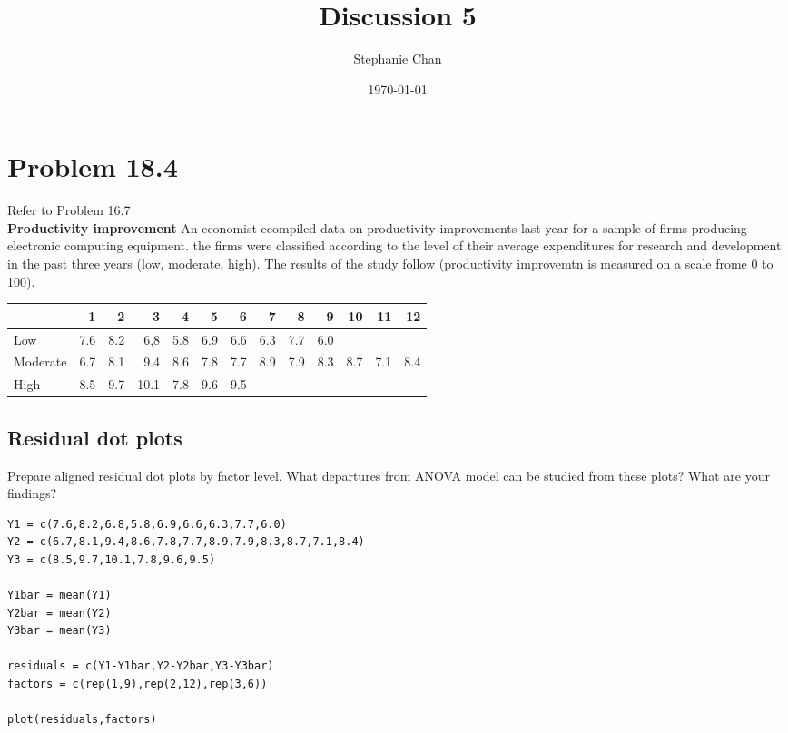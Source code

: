 \documentclass[11pt]{article}
\title{Discussion 5}
\author{Stephanie Chan}
\date{\today}
\begin{document}


\section{Problem 18.4}
\label{sec-1}

  Refer to Problem 16.7\\
\textbf{Productivity improvement} An economist ecompiled data on productivity
improvements last year for a sample of firms producing electronic
computing equipment.  the firms were classified according to the
level of their average expenditures for research and development in
the past three years (low, moderate, high).  The results of the study
follow (productivity improvemtn is measured on a scale frome 0 to
100).

\begin{center}
\begin{tabular}{lrrrrrrrrrrrr}
\hline
           &    1  &    2  &     3  &    4  &    5  &    6  &    7  &    8  &    9  &   10  &   11  &   12  \\
\hline
 Low       &  7.6  &  8.2  &   6,8  &  5.8  &  6.9  &  6.6  &  6.3  &  7.7  &  6.0  &       &       &       \\
 Moderate  &  6.7  &  8.1  &   9.4  &  8.6  &  7.8  &  7.7  &  8.9  &  7.9  &  8.3  &  8.7  &  7.1  &  8.4  \\
 High      &  8.5  &  9.7  &  10.1  &  7.8  &  9.6  &  9.5  &       &       &       &       &       &       \\
\hline
\end{tabular}
\end{center}
\subsection{Residual dot plots}
\label{sec-1-1}

Prepare aligned residual dot plots by factor level.  What departures
from ANOVA model can be studied from these plots?  What are your
findings?


\begin{verbatim}
Y1 = c(7.6,8.2,6.8,5.8,6.9,6.6,6.3,7.7,6.0)
Y2 = c(6.7,8.1,9.4,8.6,7.8,7.7,8.9,7.9,8.3,8.7,7.1,8.4)
Y3 = c(8.5,9.7,10.1,7.8,9.6,9.5)

Y1bar = mean(Y1)
Y2bar = mean(Y2)
Y3bar = mean(Y3)

residuals = c(Y1-Y1bar,Y2-Y2bar,Y3-Y3bar)
factors = c(rep(1,9),rep(2,12),rep(3,6))

plot(residuals,factors)
\end{verbatim}
\end{document}
